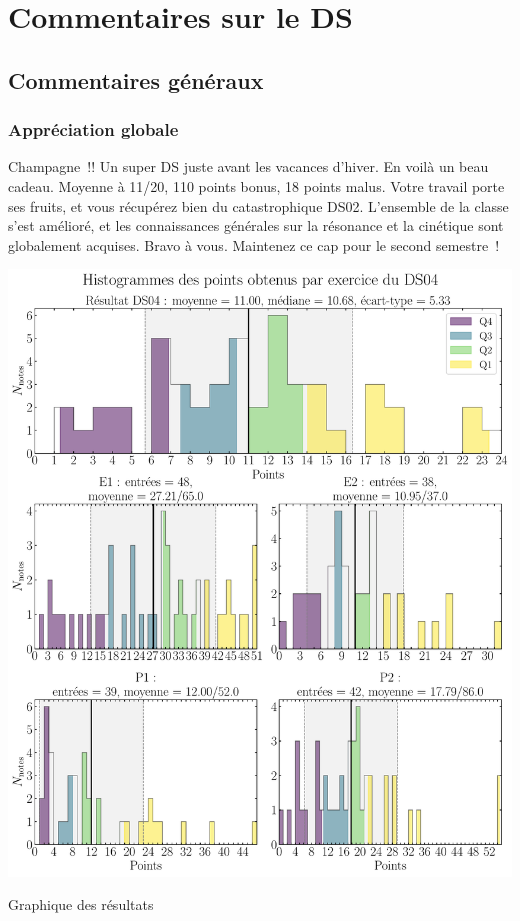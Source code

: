 \documentclass[a4paper, 10pt, final, garamond]{book}
\begin{document}
\setcounter{chapter}{3}

\def\lspace{25}

\chapter{Commentaires sur le DS }

\section{Commentaires généraux}
\subsection{Appréciation globale}
Champagne~!! Un super DS juste avant les vacances d'hiver. En voilà un beau
cadeau. Moyenne à 11/20, 110 points bonus, 18 points malus.
\smallbreak
Votre travail porte ses fruits, et vous récupérez bien du catastrophique DS02.
L'ensemble de la classe s'est amélioré, et les connaissances générales sur la
résonance et la cinétique sont globalement acquises. Bravo à vous. Maintenez ce
cap pour le second semestre~!

\begin{center}
	\includegraphics[width=.8\linewidth]{DS04_hist_all}
	\caption{Graphique des résultats}
\end{center}
\end{document}
